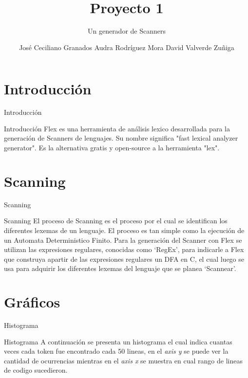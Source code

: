 \documentclass[10pt,xcolor={dvipsnames}]{beamer}
\title{Proyecto 1}
\subtitle{Un generador de Scanners}
\date{}
\author{
    José Ceciliano Granados\newline 2016087245
    \newline \newline
    Audra Rodríguez Mora \newline 2015101893
    \newline \newline
    David Valverde Zuñiga \newline 200922986
}
\institute{Instituto Tecnológico de Costa Rica
    \newline Compiladores e Intérpretes
    \newline I Semestre 2019 }
\begin{document}
    \maketitle

    \section{Introducción}
        \begin{frame}[fragile]{Introducción}
        \begin{alertblock}{Introducción}
                Flex es una herramienta de análisis lexico desarrollada para la generación de Scanners de lenguajes. Su nombre significa "fast lexical analyzer generator". Es la alternativa gratis y open-source a la herramienta "lex".
        \end{alertblock}
        \end{frame}

    \section{Scanning}
        \begin{frame}[fragile]{Scanning}
            \begin{alertblock}{Scanning}
                El proceso de Scanning es el proceso por el cual se identifican los diferentes lexemas de un lenguaje. El proceso es tan simple como la ejecución de un Automata Deterministico Finito. Para la generación del Scanner con Flex se utilizan las expresiones regulares, conocidas como `RegEx', para indicarle a Flex que construya apartir de las expresiones regulares un DFA en C, el cual luego se usa para adquirir los diferentes lexemas del lenguaje que se planea `Scannear'.
            \end{alertblock}
        \end{frame}


    \section{Gráficos}
        \begin{frame}{Histograma}
        \begin{alertblock}{Histograma}
            A continuación se presenta un histograma el cual indica cuantas veces cada token fue encontrado cada 50 lineas, en el \textit{axis y} se puede ver la cantidad de ocurrencias mientras en el \textit{axis x} se muestra en cual rango de lineas de codigo sucedieron.
            \end{alertblock}
        \end{frame}
\end{document}
